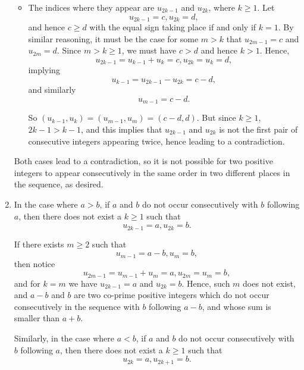 \begin{enumerate}
\begin{itemize}
              \item The indices where they appear are \(u_{2k - 1}\) and \(u_{2k}\), where \(k \geq 1\). Let
                    \[
                        u_{2k - 1} = c, u_{2k} = d,
                    \]
                    and hence \(c \geq d\) with the equal sign taking place if and only if \(k = 1\). By similar reasoning, it must be the case for some \(m > k\) that \(u_{2m - 1} = c\) and \(u_{2m} = d\). Since \(m > k \geq 1\), we must have \(c > d\) and hence \(k > 1\). Hence,
                    \[
                        u_{2k - 1} = u_{k - 1} + u_k = c, u_{2k} = u_k = d,
                    \]
                    implying
                    \[
                        u_{k - 1} = u_{2k - 1} - u_{2k} = c - d,
                    \]
                    and similarly
                    \[
                        u_{m - 1} = c - d.
                    \]

                    So \((u_{k - 1}, u_k) = (u_{m - 1}, u_m) = (c - d, d)\). But since \(k \geq 1\), \(2k - 1 > k - 1\), and this implies that \(u_{2k - 1}\) and \(u_{2k}\) is not the first pair of consecutive integers appearing twice, hence leading to a contradiction.
          \end{itemize}

          Both cases lead to a contradiction, so it is not possible for two positive integers to appear consecutively in the same order in two different places in the sequence, as desired.

    \item In the case where \(a > b\), if \(a\) and \(b\) do not occur consecutively with \(b\) following \(a\), then there does not exist a \(k \geq 1\) such that
          \[
              u_{2k - 1} = a, u_{2k} = b.
          \]

          If there exists \(m \geq 2\) such that
          \[
              u_{m - 1} = a - b, u_{m} = b,
          \]
          then notice
          \[
              u_{2m - 1} = u_{m - 1} + u_{m} = a, u_{2m} = u_{m} = b,
          \]
          and for \(k = m\) we have \(u_{2k - 1} = a\) and \(u_{2k} = b\). Hence, such \(m\) does not exist, and \(a - b\) and \(b\) are two co-prime positive integers which do not occur consecutively in the sequence with \(b\) following \(a - b\), and whose sum is smaller than \(a + b\).

          Similarly, in the case where \(a < b\), if \(a\) and \(b\) do not occur consecutively with \(b\) following \(a\), then there does not exist a \(k \geq 1\) such that
          \[
              u_{2k} = a, u_{2k + 1} = b.
          \]


\end{enumerate}
